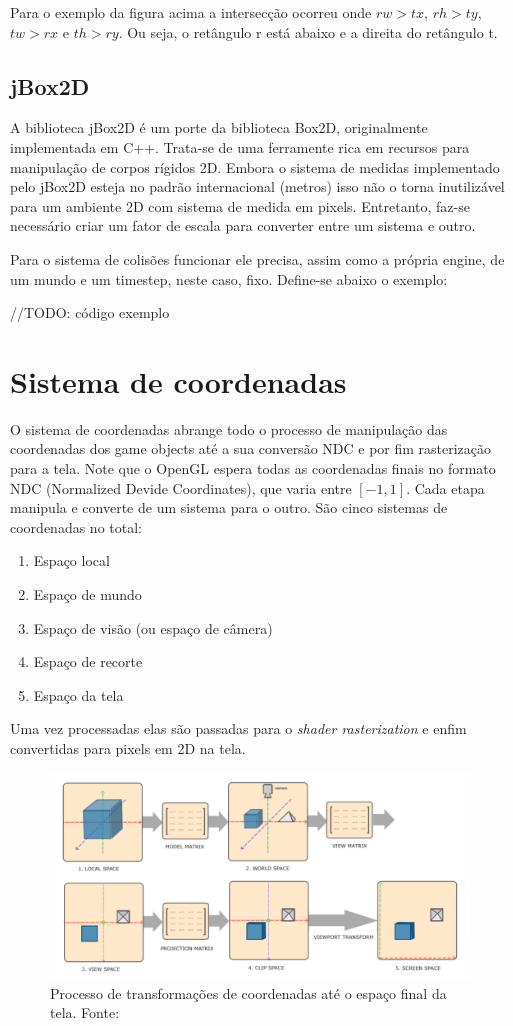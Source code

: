 \documentclass[12pt, 
openright, 
oneside, 
a4paper,    
brazil]{facom-ufu-abntex2}
\begin{document}
Para o exemplo da figura acima a intersecção ocorreu onde $rw > tx$, $rh > ty$, $tw > rx$ e $th > ry$. Ou seja, o retângulo r está abaixo e a direita do retângulo t.

\subsection{jBox2D}

A biblioteca jBox2D é um porte da biblioteca Box2D, originalmente implementada em C++. Trata-se de uma ferramente rica em recursos para manipulação de corpos rígidos 2D. Embora o sistema de medidas implementado pelo jBox2D esteja no padrão internacional (metros) isso não o torna inutilizável para um ambiente 2D com sistema de medida em pixels. Entretanto, faz-se necessário criar um fator de escala para converter entre um sistema e outro.

Para o sistema de colisões funcionar ele precisa, assim como a própria engine, de um mundo e um timestep, neste caso, fixo. Define-se abaixo o exemplo:

//TODO: código exemplo

\section{Sistema de coordenadas}

O sistema de coordenadas abrange todo o processo de manipulação das coordenadas dos game objects até a sua conversão NDC e por fim rasterização para a tela. Note que o OpenGL espera todas as coordenadas finais no formato NDC (Normalized Devide Coordinates), que varia entre $[-1,1]$. Cada etapa manipula e converte de um sistema para o outro. São cinco sistemas de coordenadas no total:

\begin{enumerate}
    \item Espaço local
    \item Espaço de mundo
    \item Espaço de visão (ou espaço de câmera)
    \item Espaço de recorte
    \item Espaço da tela
\end{enumerate}

Uma vez processadas elas são passadas para o \textit{shader rasterization} e enfim convertidas para pixels em 2D na tela.

\begin{figure}[H]
	\centering
	\includegraphics[width=30em]{imagens/coordSpace.PNG}
	\caption{Processo de transformações de coordenadas até o espaço final da tela. Fonte:~\cite{LearnOpenGL}}
\end{figure}
\end{document}
